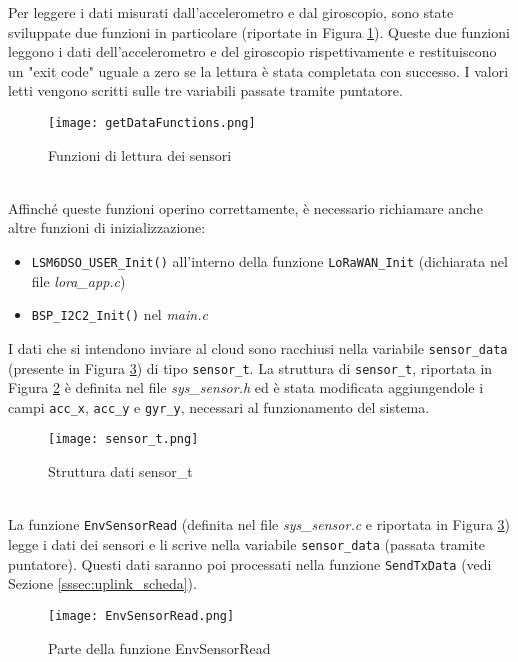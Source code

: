 Per leggere i dati misurati dall'accelerometro e dal giroscopio, sono state sviluppate due funzioni in particolare (riportate in Figura \ref{fig:lettura_sensori}). Queste due funzioni leggono i dati dell'accelerometro e del giroscopio rispettivamente e restituiscono un "exit code" uguale a zero se la lettura è stata completata con successo. I valori letti vengono scritti sulle tre variabili passate tramite puntatore.
\begin{figure}[h!]
  \centering
  \texttt{[image: getDataFunctions.png]}
  \caption{Funzioni di lettura dei sensori}
  \label{fig:lettura_sensori}
\end{figure}
\\Affinché queste funzioni operino correttamente, è necessario richiamare anche altre funzioni di inizializzazione:
\begin{itemize}
  \item \Verb|LSM6DSO_USER_Init()| all'interno della funzione \Verb|LoRaWAN_Init| (dichiarata nel file \textit{lora\_app.c})
  \item \Verb|BSP_I2C2_Init()| nel \textit{main.c}
\end{itemize}
I dati che si intendono inviare al cloud sono racchiusi nella variabile \Verb|sensor_data| (presente in Figura \ref{fig:envsensorread}) di tipo \Verb|sensor_t|. La struttura di \Verb|sensor_t|, riportata in Figura \ref{fig:sensor_t} è definita nel file \textit{sys\_sensor.h} ed è stata modificata aggiungendole i campi \Verb|acc_x|, \Verb|acc_y| e \Verb|gyr_y|, necessari al funzionamento del sistema.
\begin{figure}[h!]
  \centering
  \texttt{[image: sensor\_t.png]}
  \caption{Struttura dati sensor\_t}
  \label{fig:sensor_t}
\end{figure}
\\La funzione \Verb|EnvSensorRead| (definita nel file \textit{sys\_sensor.c} e riportata in Figura \ref{fig:envsensorread}) legge i dati dei sensori e li scrive nella variabile \Verb|sensor_data| (passata tramite puntatore). Questi dati saranno poi processati nella funzione \Verb|SendTxData| (vedi Sezione \ref{sssec:uplink_scheda}).
\begin{figure}[h!]
  \centering
  \texttt{[image: EnvSensorRead.png]}
  \caption{Parte della funzione EnvSensorRead}
  \label{fig:envsensorread}
\end{figure}

